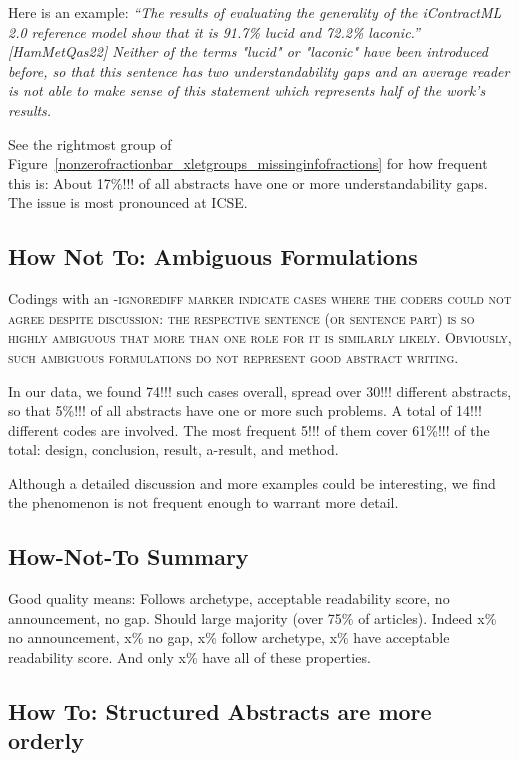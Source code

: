 \documentclass[10pt,journal,compsoc]{IEEEtran}
\newcommand{\Cb}[1]{\bgroup\scshape #1\egroup}  %
\newcommand{\Art}[1]{\bgroup[#1]\egroup} %
\newcommand{\Quote}[1]{\bgroup\itshape ``#1''\egroup}  %
\begin{document}
Here is an example:
\Quote{The results of evaluating the generality of the iContractML 2.0 reference model show
  that it is 91.7\% lucid and 72.2\% laconic.} \Art{HamMetQas22}
Neither of the terms "lucid" or "laconic" have been introduced before, so that
this sentence has two understandability gaps and
an average reader is not able to make sense of this statement
which represents half of the work's results.

See the rightmost group of Figure~\ref{nonzerofractionbar_xletgroups_missinginfofractions}
for how frequent this is:
About 17\%!!! of all abstracts have one or more understandability gaps.
The issue is most pronounced at ICSE.


\subsection{How Not To: Ambiguous Formulations}

Codings with an \Cb{-ignorediff} marker indicate cases where the coders could not agree
despite discussion: the respective sentence (or sentence part) is so highly ambiguous that
more than one role for it is similarly likely.
Obviously, such ambiguous formulations do not represent good abstract writing.

In our data, we found 74!!! such cases overall, spread over 30!!! different abstracts,
so that 5\%!!! of all abstracts have one or more such problems.
A total of 14!!! different codes are involved.
The most frequent 5!!! of them cover 61\%!!! of the total:
design, conclusion, result, a-result, and method.

Although a detailed discussion and more examples could be interesting,
we find the phenomenon is not frequent enough to warrant more detail.


\subsection{How-Not-To Summary}

Good quality means: Follows archetype, acceptable readability score, no announcement, no gap.
Should large majority (over 75\% of articles).
Indeed x\% no announcement, x\% no gap, x\% follow archetype, x\% have acceptable readability score.
And only x\% have all of these properties.


\subsection{How To: Structured Abstracts are more orderly}
\end{document}
